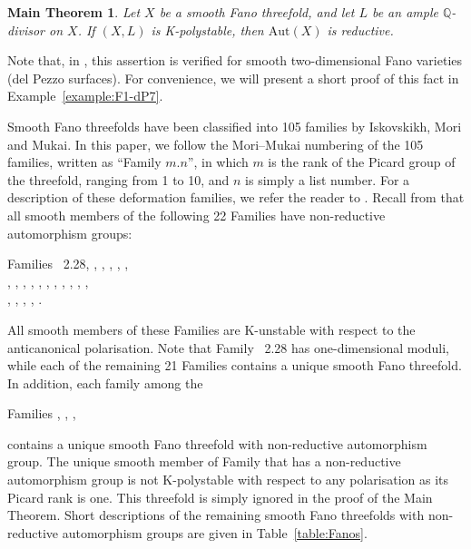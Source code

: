 \documentclass[12pt]{amsart}
\newtheorem*{maintheorem*}{Main Theorem}
\theoremstyle{definition}
\theoremstyle{remark}
\begin{document}
\begin{maintheorem*}
Let $X$ be a smooth Fano threefold, and let $L$ be an ample $\mathbb{Q}$-divisor on $X$.
If $(X,L)$ is K-polystable, then $\mathrm{Aut}(X)$ is reductive.
\end{maintheorem*}

Note that, in \cite{CheltsovMartinez-Garcia}, this assertion is verified for smooth two-dimensional Fano varieties (del Pezzo surfaces). For convenience, we will present a short proof of this fact in Example~\ref{example:F1-dP7}.

Smooth Fano threefolds have been classified into 105 families by Iskovskikh, Mori and Mukai.
In this paper, we follow the Mori--Mukai numbering of the 105 families, written as ``Family \textnumero $m.n$'',
in which $m$ is the rank of the Picard group of the threefold, ranging from 1 to 10, and $n$ is simply a list number.
For a description of these deformation families, we refer the reader to \cite{Fanography,IsPr99}.
Recall from \cite{CheltsovShramovPrzyjalkowski} that all smooth members of the following 22 Families have non-reductive automorphism groups:
\begin{center}
Families \textnumero~2.28, , , , , , \\
, , , , , , , ,
, , ,\\  , , , , .
\end{center}
All smooth members of these Families are K-unstable with respect to the anticanonical polarisation.
Note that Family \textnumero~2.28 has one-dimensional moduli, while each of the remaining 21 Families contains a unique smooth Fano threefold.
In addition, each family among the
\begin{center}
Families , , , 
\end{center}
contains a unique smooth Fano threefold with non-reductive automorphism group. The unique smooth member of Family  that has a non-reductive automorphism group is not K-polystable with respect to any polarisation as its Picard rank is one. This threefold
is simply ignored in the proof of the Main Theorem. Short descriptions of the remaining smooth Fano threefolds with non-reductive automorphism groups are given in Table~\ref{table:Fanos}.
\end{document}
